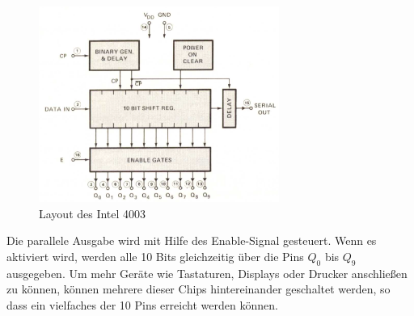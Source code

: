  \begin{figure}[h]
 	\centering
 	\includegraphics[width=0.7\textwidth]{figures/layout_4003.png}
 	\caption{Layout des Intel 4003}
 	\label{fig:layout_4003}
 \end{figure}
Die parallele Ausgabe wird mit Hilfe des Enable-Signal gesteuert. 
Wenn es aktiviert wird, werden alle 10 Bits gleichzeitig über die Pins $Q_0$ bis $Q_9$ ausgegeben. Um mehr Geräte wie Tastaturen, Displays oder Drucker anschließen zu können, können mehrere dieser Chips hintereinander geschaltet werden, so dass ein vielfaches der 10 Pins erreicht werden können.

